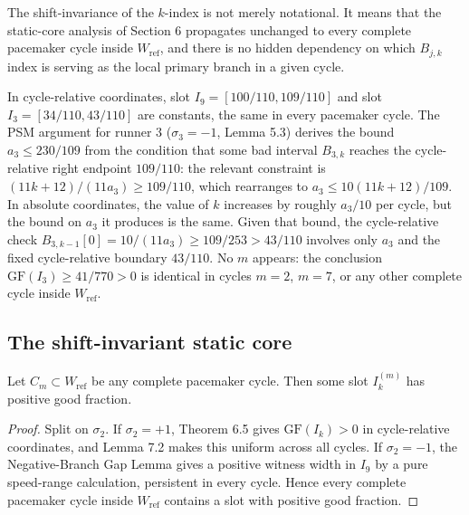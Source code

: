 \documentclass[12pt]{article}
\begin{document}
\begin{remark}
The shift-invariance of the $k$-index is not merely notational. It means that the static-core analysis of Section 6 propagates unchanged to every complete pacemaker cycle inside $W_{\mathrm{ref}}$, and there is no hidden dependency on which $B_{j,k}$ index is serving as the local primary branch in a given cycle.
\end{remark}

\begin{example} In cycle-relative coordinates, slot
$I_9=[100/110,109/110]$ and slot $I_3=[34/110,43/110]$ are constants, the same in every
pacemaker cycle. The PSM argument for runner 3 ($\sigma_3=-1$, Lemma 5.3) derives the
bound $a_3\le 230/109$ from the condition that some bad interval $B_{3,k}$ reaches the
cycle-relative right endpoint $109/110$: the relevant constraint is
$(11k+12)/(11a_3)\ge 109/110$, which rearranges to $a_3\le 10(11k+12)/109$.
In absolute coordinates, the value of $k$ increases by roughly $a_3/10$ per cycle, but
the bound on $a_3$ it produces is the same. Given that bound, the cycle-relative check
$B_{3,k-1}[0]=10/(11a_3)\ge 109/253>43/110$ involves only $a_3$ and the fixed
cycle-relative boundary $43/110$. No $m$ appears: the conclusion
$\mathrm{GF}(I_3)\ge 41/770>0$ is identical in cycles $m=2$, $m=7$, or any other
complete cycle inside $W_{\mathrm{ref}}$.
\end{example}

\subsection{The shift-invariant static core}

\begin{theorem}\label{t:73}
Let $C_m\subset W_{\mathrm{ref}}$ be any
complete pacemaker cycle. Then some slot $I_k^{(m)}$ has positive good fraction.

\end{theorem}
\begin{proof}
Split on $\sigma_2$. If $\sigma_2=+1$, Theorem 6.5 gives $\mathrm{GF}(I_k)>0$ in
cycle-relative coordinates, and Lemma 7.2 makes this uniform across all cycles. If
$\sigma_2=-1$, the Negative-Branch Gap Lemma gives a positive witness width in $I_9$ by
a pure speed-range calculation, persistent in every cycle. Hence every complete pacemaker
cycle inside $W_{\mathrm{ref}}$ contains a slot with positive good fraction.
\end{proof}
\end{document}
